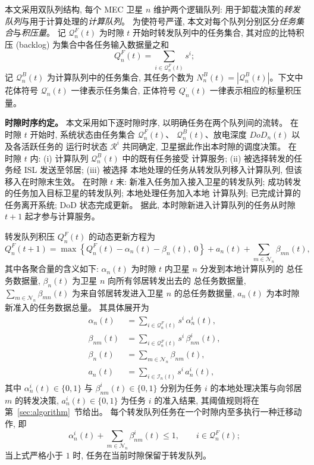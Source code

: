 \documentclass[a4paper,11pt]{article}
\begin{document}
本文采用双队列结构, 每个 MEC 卫星 $n$ 维护两个逻辑队列:
用于卸载决策的\emph{转发队列}与用于计算处理的\emph{计算队列}。
为使符号严谨, 本文对每个队列分别区分\emph{任务集合}与\emph{积压量}。
记 $\mathcal{Q}^F_n(t)$ 为时隙 $t$ 开始时转发队列中的任务集合,
其对应的比特积压 (backlog) 为集合中各任务输入数据量之和
\begin{equation}
    Q^F_n(t) = \sum_{i \in \mathcal{Q}^F_n(t)} s^i;
    \label{eq:QF_backlog}
\end{equation}
记 $\mathcal{Q}^B_n(t)$ 为计算队列中的任务集合, 其任务个数为
$N^B_n(t) = |\mathcal{Q}^B_n(t)|$。下文中花体符号
$\mathcal{Q}^{\cdot}_n(t)$ 一律表示任务集合, 正体符号
$Q^{\cdot}_n(t)$ 一律表示相应的标量积压量。

\noindent\textbf{时隙时序约定。}
本文采用如下逐时隙时序, 以明确任务在两个队列间的流转。
在时隙 $t$ 开始时, 系统状态由任务集合 $\mathcal{Q}^F_n(t)$、
$\mathcal{Q}^B_n(t)$、放电深度 $DoD_n(t)$ 以及各活跃任务的
运行时状态 $\mathcal{R}^i$ 共同确定, 卫星据此作出本时隙的调度决策。
在时隙 $t$ 内: (i) 计算队列 $\mathcal{Q}^B_n(t)$ 中的既有任务接受
计算服务; (ii) 被选择转发的任务经 ISL 发送至邻居; (iii) 被选择
本地处理的任务从转发队列移入计算队列, 但该移入在时隙末生效。
在时隙 $t$ 末: 新准入任务加入接入卫星的转发队列;
成功转发的任务加入目标卫星的转发队列; 本地处理任务加入本地
计算队列; 已完成计算的任务离开系统; DoD 状态完成更新。
据此, 本时隙新进入计算队列的任务从时隙 $t+1$ 起才参与计算服务。

转发队列积压 $Q^F_n(t)$ 的动态更新方程为
\begin{equation}
    Q^F_n(t+1) =
    \max\!\left\{Q^F_n(t) - \alpha_n(t) - \beta_n(t),\; 0\right\}
    + a_n(t) + \sum_{m \in \mathcal{N}_n} \beta_{mn}(t),
    \label{eq:QF_update}
\end{equation}
其中各聚合量的含义如下:
$\alpha_n(t)$ 为时隙 $t$ 内卫星 $n$ 分发到本地计算队列的
总任务数据量, $\beta_n(t)$ 为卫星 $n$ 向所有邻居转发出去的
总任务数据量, $\sum_{m \in \mathcal{N}_n} \beta_{mn}(t)$
为来自邻居转发进入卫星 $n$ 的总任务数据量,
$a_n(t)$ 为本时隙新准入的任务数据总量。
其具体展开为
\begin{align}
    \alpha_n(t) &= \sum_{i \in \mathcal{Q}^F_n(t)} s^i\, \alpha^i_n(t),
    \label{eq:alpha_agg}\\
    \beta_{nm}(t) &= \sum_{i \in \mathcal{Q}^F_n(t)} s^i\, \beta^i_{nm}(t),
    \label{eq:beta_nm}\\
    \beta_n(t) &= \sum_{m \in \mathcal{N}_n} \beta_{nm}(t),
    \label{eq:beta_n}\\
    a_n(t) &= \sum_{i \in \mathcal{I}_n(t)} s^i\, a^i_n(t),
    \label{eq:arrival}
\end{align}
其中 $\alpha^i_n(t) \in \{0, 1\}$ 与 $\beta^i_{nm}(t) \in \{0, 1\}$
分别为任务 $i$ 的本地处理决策与向邻居 $m$ 的转发决策,
$a^i_n(t) \in \{0, 1\}$ 为任务 $i$ 的准入结果,
其阈值规则将在第~\ref{sec:algorithm}~节给出。
每个转发队列任务在一个时隙内至多执行一种迁移动作, 即
\begin{equation}
    \alpha^i_n(t) + \sum_{m \in \mathcal{N}_n} \beta^i_{nm}(t) \le 1,
    \qquad i \in \mathcal{Q}^F_n(t);
    \label{eq:action_exclusivity}
\end{equation}
当上式严格小于 $1$ 时, 任务在当前时隙保留于转发队列。
\end{document}

